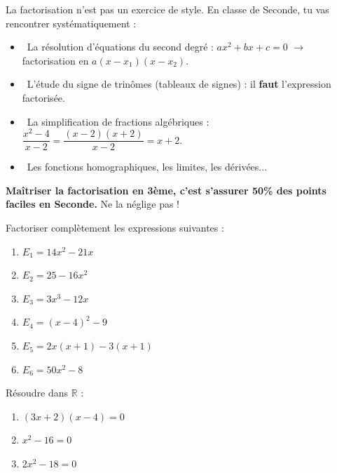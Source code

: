 \documentclass[11pt]{article}
\newcommand{\cle}[1]{{\popxbold\color{popdark}#1}}
\begin{document}
\begin{savaistu}
La factorisation n'est pas un exercice de style. En classe de Seconde, tu vas rencontrer systématiquement :
\begin{itemize}
    \item \textbullet\ La résolution d'équations du second degré : $ax^2+bx+c=0$ $\rightarrow$ factorisation en $a(x-x_1)(x-x_2)$.
    \item \textbullet\ L'étude du signe de trinômes (tableaux de signes) : il \textbf{faut} l'expression factorisée.
    \item \textbullet\ La simplification de fractions algébriques : $\dfrac{x^2-4}{x-2} = \dfrac{(x-2)(x+2)}{x-2} = x+2$.
    \item \textbullet\ Les fonctions homographiques, les limites, les dérivées...
\end{itemize}
\textbf{Maîtriser la factorisation en 3ème, c'est s'assurer 50\% des points faciles en Seconde.} Ne la néglige pas !

\begin{center}
\end{center}
\end{savaistu}

\begin{exercice}
Factoriser complètement les expressions suivantes :
\begin{enumerate}
    \item $E_1 = 14x^2 - 21x$
    \item $E_2 = 25 - 16x^2$
    \item $E_3 = 3x^3 - 12x$
    \item $E_4 = (x-4)^2 - 9$
    \item $E_5 = 2x(x+1) - 3(x+1)$
    \item $E_6 = 50x^2 - 8$
\end{enumerate}
Résoudre dans $\mathbb{R}$ :
\begin{enumerate}
    \item[7.] $(3x+2)(x-4) = 0$
    \item[8.] $x^2 - 16 = 0$
    \item[9.] $2x^2 - 18 = 0$
\end{enumerate}
\end{exercice}
\end{document}
